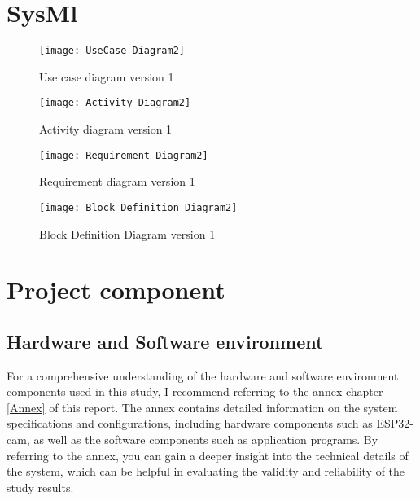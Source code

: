 \section{SysMl}

\FloatBarrier
\begin{figure}[h]

         \centering
        \texttt{[image: UseCase Diagram2]}
   
        \caption{Use case diagram version 1}
        \label{Use case diagram version 1}

    \end{figure}


\FloatBarrier

\begin{figure}[h]

         \centering
        \texttt{[image: Activity Diagram2]}
   
        \caption{Activity diagram version 1}
        \label{Activity diagram version 1}

    \end{figure}


\FloatBarrier


\begin{figure}[h]

         \centering
        \texttt{[image: Requirement Diagram2]}
   
        \caption{Requirement diagram version 1}
        \label{Requirement diagram version 1}

    \end{figure}



\FloatBarrier
\begin{figure}[h]

         \centering
        \texttt{[image: Block Definition Diagram2]}
   
        \caption{Block Definition Diagram version 1}
        \label{Block Definition Diagram version 1}

    \end{figure}


\FloatBarrier

\section{Project component}
\subsection{Hardware and Software environment}
For a comprehensive understanding of the hardware and software environment components used in this study, I recommend referring to the annex chapter \ref{Annex} of this report. The annex contains detailed information on the system specifications and configurations, including hardware components such as ESP32-cam, as well as the software components such as  application programs. By referring to the annex, you can gain a deeper insight into the technical details of the system, which can be helpful in evaluating the validity and reliability of the study results.






